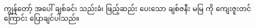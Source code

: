 ကျွန်တော့် အပေါ် ချစ်ခင်၊ သည်းခံ၊ ဖြည့်ဆည်း ပေးသော ချစ်ဇနီး မမြ ကို ကျေးဇူးတင်ကြောင်း ပြောချင်ပါသည်။ 